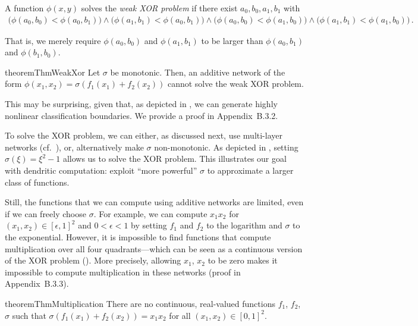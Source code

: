 \begin{definition}
\label{def:weak_xor}
A function $\phi(x, y)$ solves the \emph{weak XOR problem} if there exist $a_0, b_0, a_1, b_1$ with
\begin{align*}
	\big( \phi(a_0, b_0) < \phi(a_0, b_1) \big) \wedge
	\big( \phi(a_1, b_1) < \phi(a_0, b_1) \big) \wedge
	\big( \phi(a_0, b_0) < \phi(a_1, b_0) \big) \wedge
	\big( \phi(a_1, b_1) < \phi(a_1, b_0) \big) \,.
\end{align*}
\end{definition}
That is, we merely require $\phi(a_0, b_0)$ and $\phi(a_1, b_1)$ to be larger than $\phi(a_0, b_1)$ and $\phi(b_1, b_0)$.

\begin{restatable}{theorem}{ThmWeakXor}
\label{thm:weak_xor}
Let $\sigma$ be monotonic. Then, an additive network of the form $\phi(x_1, x_2) = \sigma(f_1(x_1) + f_2(x_2))$ cannot solve the weak XOR problem.
\end{restatable}
This may be surprising, given that, as depicted in , we can generate highly nonlinear classification boundaries.
We provide a proof in Appendix~B.3.2.

To solve the XOR problem, we can either, as discussed next, use multi-layer networks (cf.~), or, alternatively make $\sigma$ non-monotonic.
As depicted in , setting $\sigma(\xi) = \xi^2 - 1$ allows us to solve the XOR problem.
This illustrates our goal with dendritic computation: exploit \enquote{more powerful} $\sigma$ to approximate a larger class of functions.

Still, the functions that we can compute using additive networks are limited, even if we can freely choose $\sigma$.
For example, we can compute $x_1 x_2$ for $(x_1, x_2) \in [\epsilon, 1]^2$ and $0 < \epsilon < 1$ by setting $f_1$ and $f_2$ to the logarithm and $\sigma$ to the exponential.
However, it is impossible to find functions that compute multiplication over all four quadrants---which can be seen as a continuous version of the XOR problem ().
More precisely, allowing $x_1$, $x_2$ to be zero makes it impossible to compute multiplication in these networks (proof in Appendix~B.3.3).
\begin{restatable}{theorem}{ThmMultiplication}
\label{thm:multiplication}
There are no continuous, real-valued functions $f_1$, $f_2$, $\sigma$ such that $\sigma(f_1(x_1) + f_2(x_2)) = x_1 x_2$ for all $(x_1, x_2) \in [0, 1]^2$.
\end{restatable}


